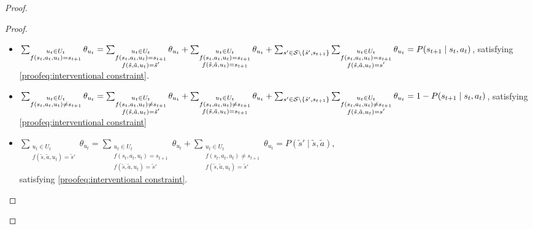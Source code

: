 \begin{proof}
\begin{proof}
\begin{itemize}        
    \item $\sum_{\substack{u_t \in U_t \\f(s_t, a_t, u_t) = s_{t+1}}} \theta_{u_t} = \sum_{\substack{u_t \in U_t \\f(s_t, a_t, u_t) = s_{t+1} \\ f(\tilde{s}, \tilde{a}, u_t) = \tilde{s}'}} \theta_{u_t} + \sum_{\substack{u_t \in U_t \\f(s_t, a_t, u_t) = s_{t+1} \\ f(\tilde{s}, \tilde{a}, u_t) = s_{t+1}}} \theta_{u_t} + \sum_{s' \in \mathcal{S}\setminus\{\tilde{s}', s_{t+1}\}}\sum_{\substack{u_t \in U_t \\f(s_t, a_t, u_t) = s_{t+1} \\ f(\tilde{s}, \tilde{a}, u_t) = s'}}{\theta_{u_t}} \\ = P(s_{t+1} \mid s_t, a_t)$, satisfying \eqref{proofeq:interventional constraint}.

    \item $\sum_{\substack{u_t \in U_t\\f(s_t, a_t, u_t) \neq s_{t+1}}}{\theta_{u_t}} = \sum_{\substack{u_t \in U_t \\f(s_t, a_t, u_t) \neq s_{t+1} \\ f(\tilde{s}, \tilde{a}, u_t) = \tilde{s}'}} \theta_{u_t} + \sum_{\substack{u_t \in U_t \\f(s_t, a_t, u_t) \neq s_{t+1} \\ f(\tilde{s}, \tilde{a}, u_t) = s_{t+1}}} \theta_{u_t} + \sum_{s' \in \mathcal{S}\setminus\{\tilde{s}', s_{t+1}\}}\sum_{\substack{u_t \in U_t \\f(s_t, a_t, u_t) \neq s_{t+1} \\ f(\tilde{s}, \tilde{a}, u_t) = s'}}{\theta_{u_t}} \\=1 -
    P(s_{t+1} \mid s_t, a_t)$, satisfying \eqref{proofeq:interventional constraint}
    
    \item $\sum_{\substack{u_t \in U_t \\f(\tilde{s}, \tilde{a}, u_t) = \tilde{s}'}} \theta_{u_t} = \sum_{\substack{u_t \in U_t \\f(s_t, a_t, u_t) = s_{t+1} \\ f(\tilde{s}, \tilde{a}, u_t) = \tilde{s}'}} \theta_{u_t} + \sum_{\substack{u_t \in U_t \\f(s_t, a_t, u_t) \neq s_{t+1} \\ f(\tilde{s}, \tilde{a}, u_t) = \tilde{s}'}} \theta_{u_t} = P(\tilde{s}' \mid \tilde{s}, \tilde{a})$, \\satisfying \eqref{proofeq:interventional constraint}.



\end{itemize}
\end{proof}
\end{proof}
